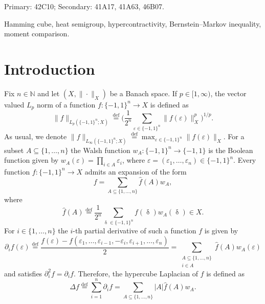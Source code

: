 \documentclass[11pt,reqno]{amsart}
\newcommand{\e}{\varepsilon}
\newcommand{\1}{\mathbf 1}
\theoremstyle{remark}
\newcommand{\N}{\mathbb N}
\newcommand{\eqdef}{\stackrel{\mathrm{def}}{=}}
\renewcommand{\delta}{\updelta}
\begin{document}
\maketitle

{\footnotesize
{} Primary: 42C10; Secondary: 41A17, 41A63, 46B07.

 Hamming cube, heat semigroup, hypercontractivity, Bernstein--Markov inequality, moment comparison.}

\section{Introduction}

Fix $n\in\N$ and let $(X,\|\cdot\|_X)$ be a Banach space. If $p\in[1,\infty)$, the vector valued $L_p$ norm of a function $f:\{-1,1\}^n\to X$ is defined as
\begin{equation}
\|f\|_{L_p(\{-1,1\}^n;X)} \eqdef \Big( \frac{1}{2^n} \sum_{\e\in\{-1,1\}^n} \|f(\e)\|_X^p\Big)^{1/p}.
\end{equation}
As usual, we denote $\|f\|_{L_\infty(\{-1,1\}^n;X)} \eqdef \max_{\e\in\{-1,1\}^n} \|f(\e)\|_X$.  For a subset $A\subseteq\{1,\ldots,n\}$ the Walsh function $w_A:\{-1,1\}^n \to \{-1,1\}$ is the Boolean function given by $w_A(\e) = \prod_{i\in A}\e_i$, where $\e=(\e_1,\ldots,\e_n)\in\{-1,1\}^n$. Every function $f:\{-1,1\}^n \to X$ admits an expansion of the form
\begin{equation}
f = \sum_{A\subseteq\{1,\ldots,n\}} \widehat{f}(A) w_A,
\end{equation}
where
\begin{equation}
\widehat{f}(A) \eqdef \frac{1}{2^n} \sum_{\delta\in\{-1,1\}^n} f(\delta) w_A(\delta) \in X.
\end{equation}
For $i\in\{1,\ldots,n\}$ the $i$-th partial derivative of such a function $f$ is given by
\begin{equation}
\partial_i f(\e) \eqdef \frac{f(\e)-f(\e_1,\ldots,\e_{i-1},-\e_i,\e_{i+1},\ldots,\e_n)}{2} = \sum_{\substack{A\subseteq\{1,\ldots,n\} \\ i\in A}} \widehat{f}(A) w_A(\e)
\end{equation}
and satisfies $\partial_i^2 f = \partial_i f$. Therefore, the hypercube Laplacian of $f$ is defined as
\begin{equation}
\Delta f \eqdef \sum_{i=1}^n \partial_i f = \sum_{A\subseteq\{1,\ldots,n\}} |A|\widehat{f}(A) w_A.
\end{equation}
\end{document}
